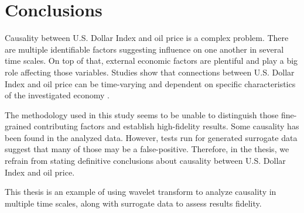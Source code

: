 \section{Conclusions} \label{sec:conclusions}

Causality between U.S. Dollar Index and oil price is a complex problem.
There are multiple identifiable factors suggesting influence on one another in several time scales.
On top of that, external economic factors are plentiful and play a big role affecting those variables.
Studies show that connections between U.S. Dollar Index and oil price can be time-varying and dependent on specific characteristics of the investigated economy \cite{2020-beckmann}. 

The methodology used in this study seems to be unable to distinguish those fine-grained contributing factors and establish high-fidelity results.
Some causality has been found in the analyzed data.
However, tests run for generated surrogate data suggest that many of those may be a false-positive.
Therefore, in the thesis, we refrain from stating definitive conclusions about causality between U.S. Dollar Index and oil price.

This thesis is an example of using wavelet transform to analyze causality in multiple time scales, 
along with surrogate data to assess results fidelity.
